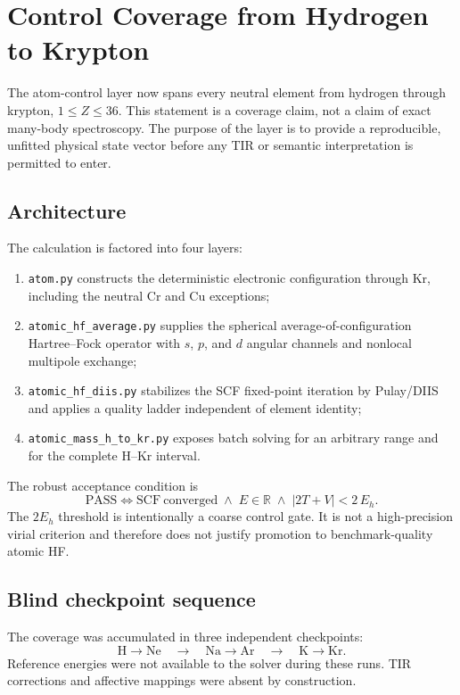 \section{Control Coverage from Hydrogen to Krypton}
\label{sec:h-to-kr-control}

The atom-control layer now spans every neutral element from hydrogen through krypton, $1\le Z\le36$. This statement is a coverage claim, not a claim of exact many-body spectroscopy. The purpose of the layer is to provide a reproducible, unfitted physical state vector before any TIR or semantic interpretation is permitted to enter.

\subsection{Architecture}

The calculation is factored into four layers:
\begin{enumerate}
  \item \texttt{atom.py} constructs the deterministic electronic configuration through Kr, including the neutral Cr and Cu exceptions;
  \item \texttt{atomic\_hf\_average.py} supplies the spherical average-of-configuration Hartree--Fock operator with $s$, $p$, and $d$ angular channels and nonlocal multipole exchange;
  \item \texttt{atomic\_hf\_diis.py} stabilizes the SCF fixed-point iteration by Pulay/DIIS and applies a quality ladder independent of element identity;
  \item \texttt{atomic\_mass\_h\_to\_kr.py} exposes batch solving for an arbitrary range and for the complete H--Kr interval.
\end{enumerate}

The robust acceptance condition is
\begin{equation}
  \mathrm{PASS} \iff
  \mathrm{SCF\ converged}\;\land\;
  E\in\mathbb{R}\;\land\;
  \left|2T+V\right| < 2\,E_h.
\end{equation}
The $2E_h$ threshold is intentionally a coarse control gate. It is not a high-precision virial criterion and therefore does not justify promotion to benchmark-quality atomic HF.

\subsection{Blind checkpoint sequence}

The coverage was accumulated in three independent checkpoints:
\begin{equation}
  \mathrm{H\rightarrow Ne}\quad\rightarrow\quad
  \mathrm{Na\rightarrow Ar}\quad\rightarrow\quad
  \mathrm{K\rightarrow Kr}.
\end{equation}
Reference energies were not available to the solver during these runs. TIR corrections and affective mappings were absent by construction.

